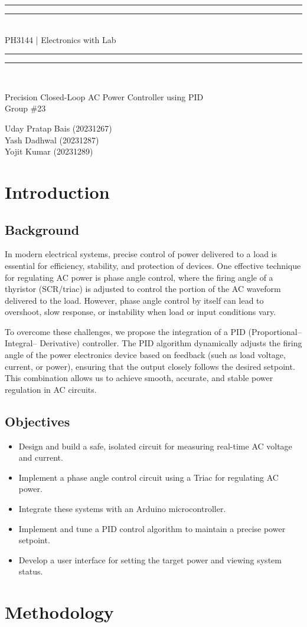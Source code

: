 \documentclass[12pt]{article}
\makeatletter
\newcommand*{\titleGP}{\begingroup
	\centering %
	\vspace*{\baselineskip} %

	\rule{\textwidth}{1.6pt}\vspace*{-\baselineskip}\vspace*{2pt} %
	\rule{\textwidth}{0.4pt}\\[\baselineskip] %
	{\LARGE PH3144 | Electronics with Lab}\\[0.2\baselineskip] %
	\rule{\textwidth}{0.4pt}\vspace*{-\baselineskip}\vspace{3.2pt} %
	\rule{\textwidth}{1.6pt}\\[2\baselineskip] %

	\vspace*{1in}
    
    \LARGE Precision Closed-Loop AC Power Controller using PID 
    \vspace*{1in}\\
    
	\LARGE Group \#23\\
	\vspace*{1in}

	\Large Uday Pratap Bais (20231267)\\
	\vspace*{0.2in}
	\Large Yash Dadhwal (20231287)\\
	\vspace*{0.2in}
	\Large Yojit Kumar (20231289)\\
	\vspace*{0.2in}
\endgroup}
\let\latexps@plain\ps@plain
\newcommand{\frontmatter}{\let\ps@plain\ps@empty\pagestyle{empty}}
\newcommand{\mainmatter}{%
  \let\ps@plain\latexps@plain\pagestyle{plain}%
  \clearpage
  \pagenumbering{arabic}}
\makeatother
\begin{document}
\frontmatter
\titleGP
\clearpage

\mainmatter
\section{Introduction}
\subsection{Background}
In modern electrical systems, precise control of power delivered to a load is essential for efficiency, stability, and protection of devices. One effective technique for regulating AC power is phase angle control, where the firing angle of a thyristor (SCR/triac) is adjusted to control the portion of the AC waveform delivered to the load. However, phase angle control by itself can lead to overshoot, slow response, or instability when load or input conditions vary.

To overcome these challenges, we propose the integration of a PID (Proportional– Integral– Derivative) controller. The PID algorithm dynamically adjusts the firing angle of the power electronics device based on feedback (such as load voltage, current, or power), ensuring that the output closely follows the desired setpoint. This combination allows us to achieve smooth, accurate, and stable power regulation in AC circuits.

\subsection{Objectives}
\begin{itemize}
\item Design and build a safe, isolated circuit for measuring real-time AC voltage and current.

\item Implement a phase angle control circuit using a Triac for regulating AC power.

\item Integrate these systems with an Arduino microcontroller.

\item Implement and tune a PID control algorithm to maintain a precise power setpoint.

\item Develop a user interface for setting the target power and viewing system status.
\end{itemize}

\section{Methodology}
\end{document}
